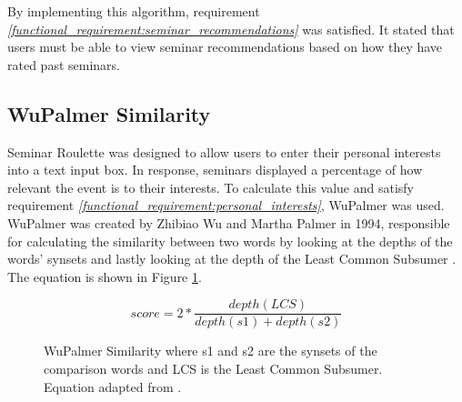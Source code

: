 \documentclass{l4proj}
\begin{document}
\begin{table}[htb]
    \centering
    \caption{Seminar rating predictions following the Singular Value Decomposition process.}
    \label{tab:seminar_predictions}
\end{table}

By implementing this algorithm, requirement \emph{\ref{functional_requirement:seminar_recommendations}} was satisfied. It stated that users must be able to view seminar recommendations based on how they have rated past seminars.

\subsection{WuPalmer Similarity}
\label{section:wupalmer}

Seminar Roulette was designed to allow users to enter their personal interests into a text input box. In response, seminars displayed a percentage of how relevant the event is to their interests. To calculate this value and satisfy requirement \emph{\ref{functional_requirement:personal_interests}}, WuPalmer was used. WuPalmer was created by Zhibiao Wu and Martha Palmer in 1994, responsible for calculating the similarity between two words by looking at the depths of the words' synsets and lastly looking at the depth of the Least Common Subsumer \citep{wupalmer}. The equation is shown in Figure \ref{fig:wupalmer}.

\begin{figure}[htb]
    \begin{equation*}
        score = 2 * \frac{depth(LCS)}{depth(s1) + depth(s2)}
    \end{equation*}
    \caption{WuPalmer Similarity where s1 and s2 are the synsets of the comparison words and LCS is the Least Common Subsumer. Equation adapted from \cite{wupalmer}.}
    \label{fig:wupalmer} 
\end{figure}
\end{document}
